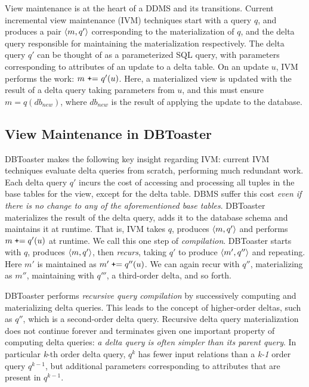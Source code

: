 \label{sec:compilation}

View maintenance is at the heart of a DDMS and its transitions.
Current incremental view maintenance (IVM) techniques start with a query $q$,
and produces a pair ${\langle m,q'\rangle}$ corresponding to the materialization of $q$,
and the delta query responsible for maintaining the materialization
respectively. The delta query $q'$ can be thought of as a parameterized SQL
query, with parameters corresponding to attributes of an update to a delta
table. On an update $u$, IVM performs the work: $m \mbox{ {\tt+}= } q'(u)$.
Here, a materialized view is updated with the result of a delta query taking
parameters from $u$, and this must ensure $m = q(db_{new})$, where $db_{new}$ is
the result of applying the update to the database.

\subsection{View Maintenance in DBToaster}
DBToaster makes the following key insight regarding IVM: current IVM techniques
evaluate delta queries from scratch, performing much redundant work. Each delta
query $q'$ incurs the cost of accessing and processing all tuples in the base
tables for the view, except for the delta table. DBMS suffer this cost
\textit{even if there is no change to any of the aforementioned base tables}.
DBToaster materializes the result of the delta query, adds it to the database
schema and maintains it at runtime.
That is, IVM takes $q$, produces ${\langle m,q'\rangle}$ and performs
$m \; \mbox{{\tt +}=} \; q'(u)$ at runtime. We call this one step of
\textit{compilation}. DBToaster starts with $q$, produces
${\langle m,q'\rangle}$, then \textit{recurs}, taking $q'$ to produce ${\langle m', q''\rangle}$
and repeating. Here $m'$ is maintained as $m' \; \mbox{{\tt +}=} \; q''(u)$.
We can again recur with $q''$, materializing as $m''$, maintaining with
$q'''$, a third-order delta, and so forth.

DBToaster performs \textit{recursive query compilation} by successively
computing and materializing delta queries. This leads to the concept of
higher-order deltas, such as $q''$, which is a second-order delta query.
Recursive delta query materialization does not continue forever and terminates
given one important property of computing delta queries: \textit{a delta query
is often simpler than its parent query}. In particular \textit{k}-th order delta
query, $q^k$ has fewer input relations than a \textit{k-1} order query
$q^{k-1}$, but additional parameters corresponding to attributes that are
present in $q^{k-1}$.

